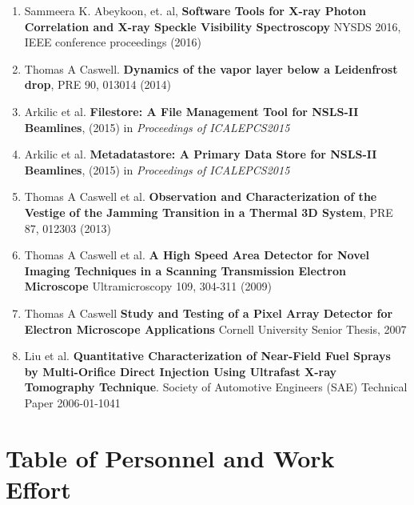 \documentclass[12pt]{article}
\numberwithin{page}{section}
\begin{document}
\begin{enumerate}[noitemsep]
  \item Sammeera K. Abeykoon, et. al, \textbf{Software Tools for X-ray
    Photon Correlation and X-ray Speckle Visibility Spectroscopy}
    NYSDS 2016, IEEE conference proceedings (2016)

  \item Thomas A Caswell. \textbf{Dynamics of the vapor layer below a
    Leidenfrost drop}, PRE 90, 013014 (2014)

  \item Arkilic et al. \textbf{Filestore: A File Management Tool for
    NSLS-II Beamlines}, (2015) in \emph{Proceedings of ICALEPCS2015}

  \item Arkilic et al. \textbf{Metadatastore: A Primary Data Store for
    NSLS-II Beamlines}, (2015) in \emph{Proceedings of ICALEPCS2015}

  \item Thomas A Caswell et al. \textbf{Observation and
    Characterization of the Vestige of the Jamming Transition in a
    Thermal 3D System}, PRE 87, 012303 (2013)

  \item Thomas A Caswell et al. \textbf{A High Speed Area
    Detector for Novel Imaging Techniques in a Scanning Transmission
    Electron Microscope} Ultramicroscopy 109, 304-311 (2009)

  \item Thomas A Caswell \textbf{Study and Testing of a Pixel
    Array Detector for Electron Microscope Applications} Cornell
  University Senior Thesis, 2007

  \item Liu et al. \textbf{Quantitative Characterization of Near-Field Fuel
    Sprays by Multi-Orifice Direct Injection Using Ultrafast X-ray Tomography Technique}.
  Society of Automotive Engineers (SAE) Technical Paper 2006-01-1041

\end{enumerate}

\newpage
\section{Table of Personnel and Work Effort}
\setcounter{page}{1}
\end{document}
